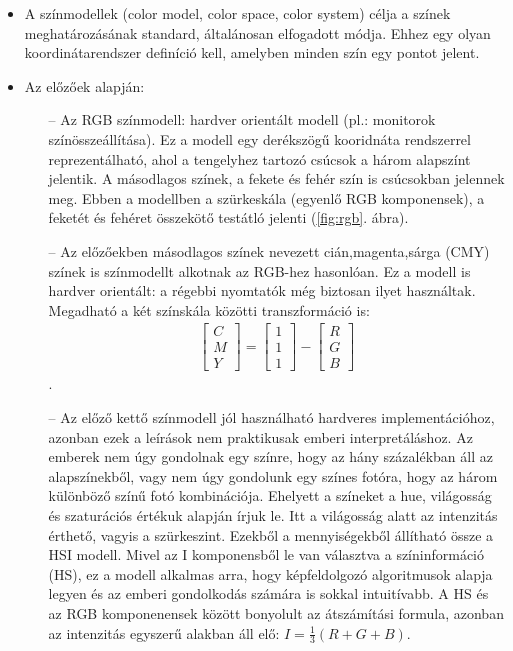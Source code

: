 \documentclass[12pt]{article}
\theoremstyle{plain}
\begin{document}
\begin{itemize}
    \item A színmodellek (color model, color space, color system) célja a színek meghatározásának standard, általánosan elfogadott módja. Ehhez egy olyan koordinátarendszer definíció kell, amelyben minden szín egy pontot jelent. 
    \item Az előzőek alapján:
    \begin{itemize}
        \item[--] Az RGB színmodell: hardver orientált modell (pl.: monitorok színösszeállítása). Ez a modell egy derékszögű kooridnáta rendszerrel reprezentálható, ahol a tengelyhez tartozó csúcsok a három alapszínt jelentik. A másodlagos színek, a fekete és fehér szín is csúcsokban jelennek meg. Ebben a modellben a szürkeskála (egyenlő RGB komponensek), a feketét és fehéret összekötő testátló jelenti (\ref{fig:rgb}. ábra).
        \item[--] Az előzőekben másodlagos színek nevezett cián,magenta,sárga (CMY) színek is színmodellt alkotnak az RGB-hez hasonlóan. Ez a modell is hardver orientált: a régebbi nyomtatók még biztosan ilyet használtak. Megadható a két színskála közötti transzformáció is:
        \begin{align}
    \begin{bmatrix}
           C \\
           M \\
           Y
         \end{bmatrix} = 
             \begin{bmatrix}
           1 \\
           1 \\
           1
         \end{bmatrix} -
             \begin{bmatrix}
           R \\
           G \\
           B
         \end{bmatrix}
  \end{align}.
  \item[--] Az előző kettő színmodell jól használható hardveres implementációhoz, azonban ezek a leírások nem praktikusak emberi interpretáláshoz. Az emberek nem úgy gondolnak egy színre, hogy az hány százalékban áll az alapszínekből, vagy nem úgy gondolunk egy színes fotóra, hogy az három különböző színű fotó kombinációja. Ehelyett a színeket a hue, világosság és szaturációs értékuk alapján írjuk le. Itt a világosság alatt az intenzitás érthető, vagyis a szürkeszint. Ezekből a mennyiségekből állítható össze a HSI modell. Mivel az I komponensből le van választva a színinformáció (HS), ez a modell alkalmas arra, hogy képfeldolgozó algoritmusok alapja legyen és az emberi gondolkodás számára is sokkal intuitívabb. A HS és az RGB komponenensek között bonyolult az átszámítási formula, azonban az intenzitás egyszerű alakban áll elő: $I = \frac{1}{3}(R+G+B).$
    \end{itemize}{}
\end{itemize}{}
\end{document}

